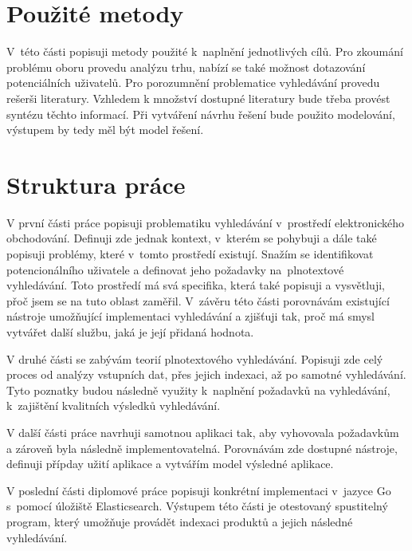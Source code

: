 \documentclass[FM,DP]{tulthesis}
\begin{document}
\section{Použité metody}

V~této části popisuji metody použité k~naplnění jednotlivých cílů. Pro zkoumání problému
oboru provedu analýzu trhu, nabízí se také možnost dotazování potenciálních uživatelů.
Pro porozumnění problematice vyhledávání provedu rešerši literatury. Vzhledem k množství
dostupné literatury bude třeba provést syntézu těchto informací. Při vytváření 
návrhu řešení bude použito modelování, výstupem by tedy měl být model řešení. 

\section{Struktura práce}

V první části práce popisuji problematiku vyhledávání v~prostředí elektronického obchodování. 
Definuji zde jednak kontext, v~kterém se pohybuji a dále také popisuji problémy, 
které v~tomto prostředí existují. Snažím se identifikovat potencionálního uživatele 
a definovat jeho požadavky na~plnotextové vyhledávání. Toto prostředí má svá specifika, 
která také popisuji a vysvětluji, přoč jsem se na tuto oblast zaměřil. V~závěru této části porovnávám
existující nástroje umožňující implementaci vyhledávání a zjišťuji tak, proč má smysl
vytvářet další službu, jaká je její přidaná hodnota.

V druhé části se zabývám teorií plnotextového vyhledávání. Popisuji zde celý
proces od analýzy vstupních dat, přes jejich indexaci, až po samotné vyhledávání. 
Tyto poznatky budou následně využity k~naplnění požadavků na vyhledávání, k~zajištění
kvalitních výsledků vyhledávání.

V další části práce navrhuji samotnou aplikaci tak, aby vyhovovala požadavkům a zároveň byla 
následně implementovatelná. Porovnávám zde dostupné nástroje, definuji přípday užití aplikace
a vytvářím model výsledné aplikace.

V poslední části diplomové práce popisuji konkrétní implementaci v~jazyce Go s~pomocí úložiště 
Elasticsearch. Výstupem této části je otestovaný spustitelný program, který umožňuje provádět 
indexaci produktů a jejich následné vyhledávání.


\end{document}
